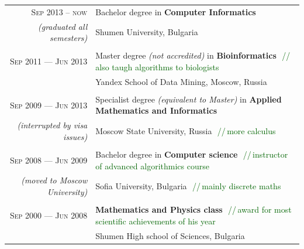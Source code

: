 \documentclass[a4paper,10pt]{article}
\def\myline{\color{linegray}\vline}
\newcommand{\minorcolor}[1]{\textcolor{mygray}{#1}}
\newcommand{\comment}[1]{\small\textcolor{darkgreen}{\,\,//\,#1}}
\newcommand{\mydate}[1]{\minorcolor{\textsc{#1}}}
\newcommand{\bracketcomment}[1]{{\small\textit{\minorcolor{(#1)}}}}
\begin{document}
\hspace{-2mm}\begin{tabular}{r!{\myline}p{14cm}}
  \mydate{Sep 2013 -- now}     &  Bachelor degree in \textbf{Computer Informatics}\\
\bracketcomment{graduated all semesters}  &  Shumen University, Bulgaria\\

        \\
        \mydate{Sep 2011 --- Jun 2013}      &   Master degree \bracketcomment{not accredited} in \textbf{Bioinformatics}
                                                \comment{also taugh algorithms to biologists}\\
	                                    &   Yandex School of Data Mining, Moscow, Russia\\
	
        \\
        \mydate{Sep 2009 --- Jun 2013}      &   Specialist degree \bracketcomment{equivalent to Master} in \textbf{Applied Mathematics and Informatics}\\
        \bracketcomment{interrupted by visa issues} & Moscow State University, Russia
                                                      \comment{more calculus}\\

	\\
        \mydate{Sep 2008 --- Jun 2009}      &   Bachelor degree in \textbf{Computer science}
                                                \comment{instructor of advanced algorithmics course}\\
        \bracketcomment{moved to Moscow University} &  Sofia University, Bulgaria \comment{mainly discrete maths}\\
	
	\\
        \mydate{Sep 2000 --- Jun 2008}      &   \textbf{Mathematics and Physics class}
                                                \comment{award for most scientific achievements of his year}\\
                                            &   Shumen High school of Sciences, Bulgaria\\
\end{tabular}
\par\smallskip
\end{document}
